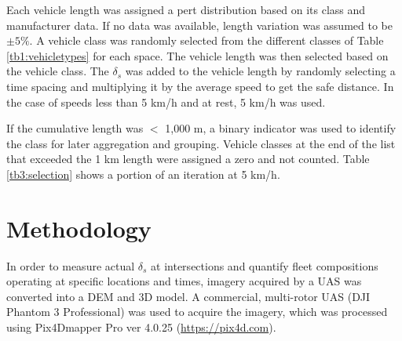 \documentclass[preprint,12pt,a4paper]{elsarticle}
\begin{document}
\begin{linenumbers}
Each vehicle length was assigned a pert distribution based on its class and manufacturer data.  If no data was available, length variation was assumed to be $\pm5\%$. A vehicle class was randomly selected from the different classes of Table \ref{tb1:vehicletypes} for each space.  The vehicle length was then selected based on the vehicle class.  The $\delta_{s}$ was added to the vehicle length by randomly selecting a time spacing and multiplying it by the average speed to get the safe distance. In the case of speeds less than 5 km/h and at rest, 5 km/h was used.  

If the cumulative length was $<$ 1,000 m, a binary indicator was used to identify the class for later aggregation and grouping.  Vehicle classes at the end of the list that exceeded the 1 km length were assigned a zero and not counted.  Table \ref{tb3:selection} shows a portion of an iteration at 5 km/h. 

\begin{table}[H]
\centering
\caption[Vehicle density sample]{Sample of an iteration showing vehicle class and road space selection for speed = 5 km/h.}
\label{tb3:selection}
\end{table}

\section{Methodology}

In order to measure actual $\delta_{s}$ at intersections and quantify fleet compositions operating at specific locations and times, imagery acquired by a UAS was converted into a DEM and 3D model. A commercial, multi-rotor UAS (DJI Phantom 3 Professional) was used to acquire the imagery, which was processed using Pix4Dmapper Pro ver 4.0.25 (\url{https://pix4d.com}).


\end{linenumbers}
\end{document}
